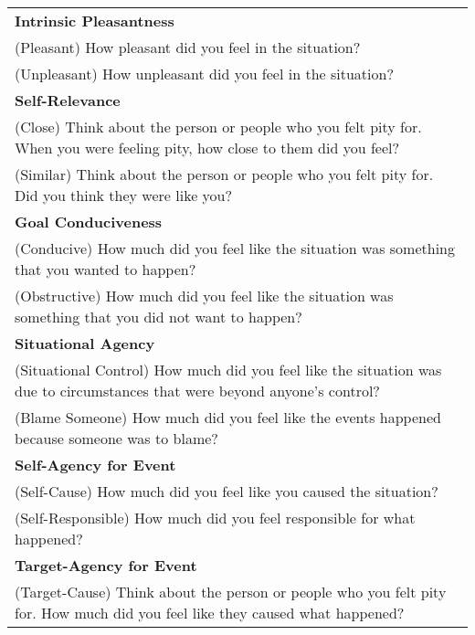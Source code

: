 \documentclass[man]{apa6}
\begin{document}
\newpage
\tiny
\begin{longtable}{p{16cm}}
\textbf{Intrinsic Pleasantness} \\
\hspace{1cm}(Pleasant) How pleasant did you feel in the situation? \\
\hspace{1cm}(Unpleasant) How unpleasant did you feel in the situation? \\
\textbf{Self-Relevance} \\
\hspace{1cm}(Close) Think about the person or people who you felt pity for. When you were feeling pity, how close to them did you feel? \\
\hspace{1cm}(Similar) Think about the person or people who you felt pity for. Did you think they were like you? \\
\textbf{Goal Conduciveness} \\
\hspace{1cm}(Conducive) How much did you feel like the situation was something that you wanted to happen? \\
\hspace{1cm}(Obstructive) How much did you feel like the situation was something that you did not want to happen? \\
\textbf{Situational Agency} \\
\hspace{1cm}(Situational Control) How much did you feel like the situation was due to circumstances that were beyond anyone’s control? \\
\hspace{1cm}(Blame Someone) How much did you feel like the events happened because someone was to blame? \\
\textbf{Self-Agency for Event} \\
\hspace{1cm}(Self-Cause) How much did you feel like you caused the situation? \\
\hspace{1cm}(Self-Responsible) How much did you feel responsible for what happened? \\
\textbf{Target-Agency for Event} \\
\hspace{1cm}(Target-Cause) Think about the person or people who you felt pity for. How much did you feel like they caused what happened? \\

\end{longtable}
\end{document}
